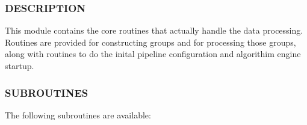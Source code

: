 \subsubsection*{DESCRIPTION\label{ORAC::Core_DESCRIPTION}}

This module contains the core routines that actually handle the 
data processing. Routines are provided for constructing groups
and for processing those groups, along with routines to do the
inital pipeline configuration and algorithim engine startup.

\subsubsection*{SUBROUTINES\label{ORAC::Core_SUBROUTINES}}

The following subroutines are available:

